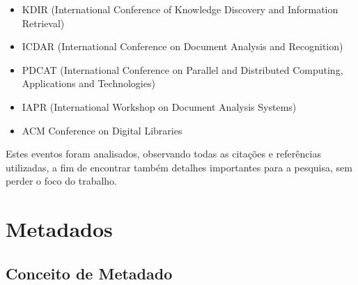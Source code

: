 \begin{itemize}
    \item KDIR (International Conference of Knowledge Discovery and Information Retrieval)
    \item ICDAR (International Conference on Document Analysis and Recognition)
    \item PDCAT (International Conference on Parallel and Distributed Computing, Applications and Technologies)
    \item IAPR (International Workshop on Document Analysis Systems)
    \item ACM Conference on Digital Libraries
\end{itemize}

\begin{textedited}
Estes eventos foram analisados, observando todas as citações e referências utilizadas, a fim de encontrar também detalhes importantes para a pesquisa, sem perder o foco do trabalho.
\end{textedited}

\section{Metadados}
\label{sec:metadados}


\subsection{Conceito de Metadado}
\label{ssec:metadata-concept}

